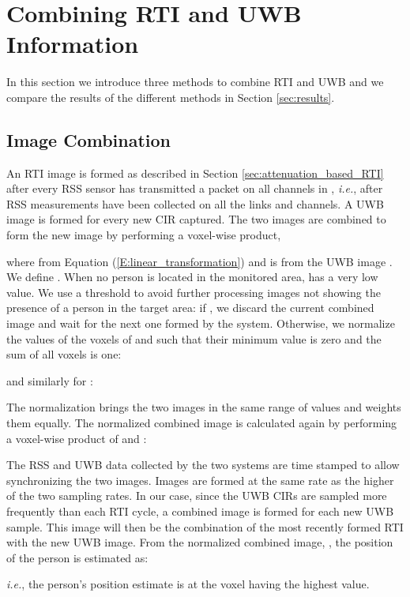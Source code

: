 \documentclass[conference]{IEEEtran}
\begin{document}
\section{Combining RTI and UWB Information} \label{sec:combining} In
this section we introduce three methods to combine RTI and UWB and we
compare the results of the different methods in Section
\ref{sec:results}.

\subsection{Image Combination} \label{sec:image_product}

An RTI image is formed as described in Section
\ref{sec:attenuation_based_RTI} after every RSS sensor has transmitted
a packet on all channels in , \emph{i.e.}, after RSS
measurements have been collected on all the links and channels. A UWB
image is formed for every new CIR captured. The two images are
combined to form the new image  by performing a voxel-wise
product,

where  from Equation
(\ref{E:linear_transformation}) and  is from the UWB image
. We define . When no person is
located in the monitored area,  has a very low value. We use
a threshold  to avoid further processing images not showing the
presence of a person in the target area: if , we
discard the current combined image and wait for the next one formed by
the system. Otherwise, we normalize the values of the voxels of 
and  such that their minimum value is zero and the sum of all
voxels is one:

and similarly for :

The normalization brings the two images in the same range of values
and weights them equally. The normalized combined image  is
calculated again by performing a voxel-wise product of  and
:

The RSS and UWB data collected by the two systems are time stamped to
allow synchronizing the two images. Images are formed at the same rate
as the higher of the two sampling rates. In our case, since the UWB
CIRs are sampled more frequently than each RTI cycle, a combined image
is formed for each new UWB sample. This image will then be the
combination of the most recently formed RTI with the new UWB
image. From the normalized combined image, , the position
of the person is estimated as:

\emph{i.e.}, the person's position estimate is at the voxel  having the highest value.
\end{document}
